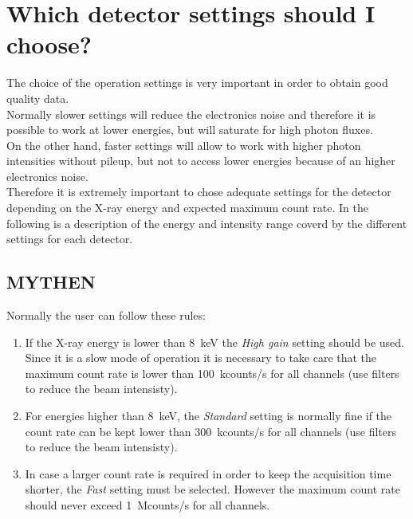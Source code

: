 

\section{Which detector settings should I choose?}

The choice of the operation settings is very important in order to obtain good quality data. \\
Normally slower settings will reduce the electronics noise and therefore it is possible to work at lower energies, but will saturate for high photon fluxes.\\
On the other hand, faster settings will allow to work with higher photon intensities without pileup, but not to access lower energies because of an higher electronics noise.\\
Therefore it is extremely important to chose adequate settings for the detector depending on the X-ray energy and expected maximum count rate.
In the following is a description of the energy and intensity range coverd by the different settings for each detector.




\subsection{MYTHEN}

Normally the user can follow these rules:
\begin{enumerate}
\item If the X-ray energy is lower than 8~keV the \textit{High gain} setting should be used. Since it is a slow mode of operation it is necessary to take care that the maximum count rate is lower than 100~kcounts/s for all channels (use filters to reduce the beam intensisty).
\item For energies higher than 8~keV, the \textit{Standard} setting is normally fine if the count rate can be kept lower than 300~kcounts/s for all channels (use filters to reduce the beam intensisty). 

\item In case a larger count rate is required in order to keep the acquisition time shorter, the \textit{Fast} setting must be selected. However the maximum count rate should never exceed 1~Mcounts/s   for all channels.
\end{enumerate}


